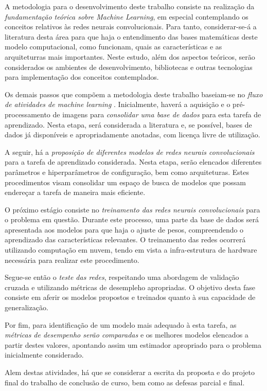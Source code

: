 A metodologia para o desenvolvimento deste trabalho consiste na realização da \emph{fundamentação teórica sobre Machine Learning}, em especial contemplando os conceitos relativos às redes neurais convolucionais. Para tanto, considerar-se-á a literatura desta área para que haja o entendimento das bases matemáticas deste modelo computacional, como funcionam, quais as características e as arquiteturras mais importantes. Neste estudo, além dos aspectos teóricos, serão considerados os ambientes de desenvolvimento, bibliotecas e outras tecnologias para implementação dos conceitos contemplados.

Os demais passos que compõem a metodologia deste trabalho baseiam-se no \emph{fluxo de atividades de machine learning} \cite{marsland2015machine}. Inicialmente, haverá a aquisição e o pré-processamento de imagens para \emph{consolidar uma base de dados} para esta tarefa de aprendizado. Nesta etapa, será considerada a literatura e, se possível, bases de dados já disponíveis e apropriadamente anotadas, com licença livre de utilização.

A seguir, há a \emph{proposição de diferentes modelos de redes neurais convolucionais} para a tarefa de aprendizado considerada. Nesta etapa, serão elencados diferentes parâmetros e hiperparâmetros de configuração, bem como arquiteturas. Estes procedimentos visam consolidar um espaço de busca de modelos que possam endereçar a tarefa de maneira mais eficiente.

O próximo estágio consiste no \emph{treinamento das redes neurais convolucionais} para o problema em questão. Durante este processo, uma parte da base de dados será apresentada aos modelos para que haja o ajuste de pesos, compreendendo o aprendizado das características relevantes. O treinamento das redes ocorrerá utilizando computação em nuvem, tendo em vista a infra-estrutura de hardware necessária para realizar este procedimento.

Segue-se então o \emph{teste das redes}, respeitando uma abordagem de validação cruzada e utilizando métricas de desempleho apropriadas. O objetivo desta fase consiste em aferir os modelos propostos e treinados quanto à sua capacidade de generalização.

Por fim, para identificação de um modelo mais adequado à esta tarefa, as \emph{métricas de desempenho serão comparadas} e os melhores modelos elencados a partir destes valores, apontando assim um estimador apropriado para o problema inicialmente considerado.

Alem destas atividades, há que se considerar a escrita da proposta e do projeto final do trabalho de conclusão de curso, bem como as defesas parcial e final.
